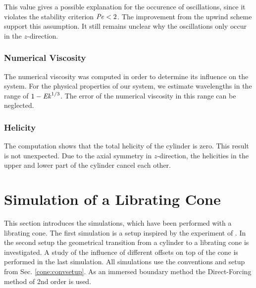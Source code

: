 This value gives a possible explanation for the occurence of oscillations,
since it violates the stability criterion $\mbox{\textit{Pe}}<2$.
The improvement from the upwind scheme support this assumption.
It still remains unclear why the oscillations only occur in the $z$-direction.

\subsubsection{Numerical Viscosity}

The numerical viscosity was computed in order to determine its influence on the system.
For the physical properties of our system, we estimate wavelengths in the range of $1 - \mbox{\textit{Ek}}^{1/3}$.
The error of the numerical viscosity in this range can be neglected.

\subsubsection{Helicity}

The computation shows that the total helicity of the cylinder is zero.
This result is not unexpected.
Due to the axial symmetry in $z$-direction, the helicities in the upper and lower part of the cylinder cancel each other.

\newpage

\section{Simulation of a Librating Cone}

This section introduces the simulations, which have been performed
with a librating cone. The first simulation is a setup inspired by the experiment of \citep{Beardsley1970}.
In the second setup the geometrical transition from a cylinder to a librating cone is investigated.
A study of the influence of different offsets on top of the cone is performed in the last simulation.
All simulations use the conventions and setup from Sec. \ref{cone:convsetup}.
As an immersed boundary method the Direct-Forcing method of 2nd order is used.

